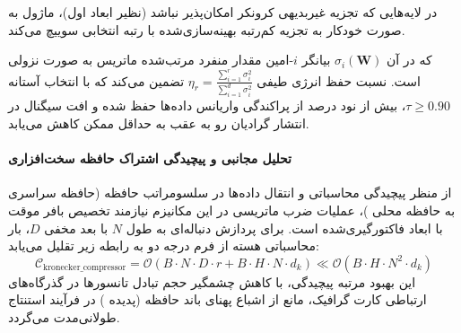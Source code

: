 در لایه‌هایی که تجزیه غیربدیهی کرونکر امکان‌پذیر نباشد (نظیر ابعاد اول)، ماژول به صورت خودکار به تجزیه کم‌رتبه بهینه‌سازی‌شده  با رتبه انتخابی سوییچ می‌کند.

که در آن $\sigma_i(\mathbf{W})$ بیانگر $i$-امین مقدار منفرد مرتب‌شده ماتریس به صورت نزولی است. نسبت حفظ انرژی طیفی $\eta_r = \frac{\sum_{i=1}^r \sigma_i^2}{\sum_{i=1}^{d} \sigma_i^2}$ تضمین می‌کند که با انتخاب آستانه $\tau \ge 0.90$، بیش از نود درصد از پراکندگی واریانس داده‌ها حفظ شده و افت سیگنال در انتشار گرادیان رو به عقب به حداقل ممکن کاهش می‌یابد.

\paragraph{تحلیل مجانبی و پیچیدگی اشتراک حافظه سخت‌افزاری}
از منظر پیچیدگی محاسباتی و انتقال داده‌ها در سلسومراتب حافظه (حافظه سراسری  به حافظه محلی )، عملیات ضرب ماتریسی در این مکانیزم نیازمند تخصیص بافر موقت با ابعاد فاکتورگیری‌شده است. برای پردازش دنباله‌ای به طول $N$ با بعد مخفی $D$، بار محاسباتی هسته از فرم درجه دو به رابطه زیر تقلیل می‌یابد:
\begin{equation}
\label{eq:complexity_kronecker_compressor}
\mathcal{C}_{\text{kronecker\_compressor}} = \mathcal{O}\left( B \cdot N \cdot D \cdot r + B \cdot H \cdot N \cdot d_k \right) \ll \mathcal{O}\left( B \cdot H \cdot N^2 \cdot d_k \right)
\end{equation}
این بهبود مرتبه پیچیدگی، با کاهش چشمگیر حجم تبادل تانسورها در گذرگاه‌های ارتباطی کارت گرافیک، مانع از اشباع پهنای باند حافظه (پدیده ) در فرآیند استنتاج طولانی‌مدت می‌گردد.
